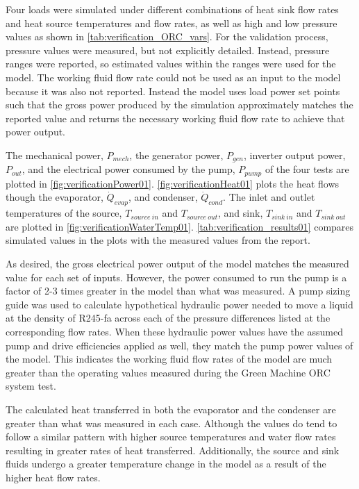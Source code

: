 Four loads were simulated under different combinations of heat sink flow rates and heat source temperatures and flow rates, as well as high and low pressure values as shown in  \autoref{tab:verification_ORC_vars}. For the validation process, pressure values were measured, but not explicitly detailed. Instead, pressure ranges were reported, so estimated values within the ranges were used for the model. The working fluid flow rate could not be used as an input to the model because it was also not reported. Instead the model uses load power set points such that the gross power produced by the simulation approximately matches the reported value and returns the necessary working fluid flow rate to achieve that power output.  


The mechanical power, $P_{mech}$, the generator power, $P_{gen}$, inverter output power, $P_{out}$, and the electrical power consumed by the pump, $P_{pump}$ of the four tests are plotted in \autoref{fig:verificationPower01}. \autoref{fig:verificationHeat01} plots the heat flows though the evaporator, $\dot{Q}_{evap}$, and condenser,  $\dot{Q}_{cond}$. The inlet and outlet temperatures of the source, $T_{source\ in}$ and $T_{source\ out}$, and sink, $T_{sink\ in}$ and $T_{sink\ out}$ are plotted in \autoref{fig:verificationWaterTemp01}. \autoref{tab:verification_results01} compares simulated values in the plots with the measured values from the report.





As desired, the gross electrical power output of the model matches the measured value for each set of inputs. However, the power consumed to run the pump is a factor of 2-3 times greater in the model than what was measured. A pump sizing guide \cite{CheGuide2017} was used to calculate hypothetical hydraulic power needed to move a liquid at the density of R245-fa across each of the pressure differences listed at the corresponding flow rates. When these hydraulic power values have the assumed pump and drive efficiencies applied as well, they match the pump power values of the model. This indicates the working fluid flow rates of the model are much greater than the operating values measured during the Green Machine ORC system test.

The calculated heat transferred in both the evaporator and the condenser are greater than what was measured in each case. Although the values do tend to follow a similar pattern with higher source temperatures and water flow rates resulting in greater rates of heat transferred. Additionally, the source and sink fluids undergo a greater temperature change in the model as a result of the higher heat flow rates.


